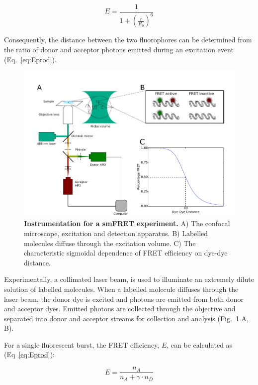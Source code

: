 \begin{equation}
E = \frac{1}{1 + (\frac{r}{R_0})^6} 
\label{eq:efficiency}
\end{equation}

Consequently, the distance between the two fluorophores can be determined from the ratio of donor and acceptor photons emitted during an excitation event (Eq.~\ref{eq:Eprod}).

\begin{figure}[!ht]
   \begin{center}
      \includegraphics*[clip=true, width=5in]{pyFRET/Fig1_schematic.pdf}
      \caption{{\bf Instrumentation for a smFRET experiment.} A) The confocal microscope, excitation and detection apparatus. B) Labelled molecules diffuse through the excitation volume. C) The characteristic sigmoidal dependence of FRET efficiency on dye-dye distance.}
      \label{fig:fig1_instrumentation}
   \end{center}
\end{figure}


Experimentally, a collimated laser beam, is used to illuminate an extremely dilute solution of labelled molecules. When a labelled molecule diffuses through the laser beam, the donor dye is excited and photons are emitted from both donor and acceptor dyes.  Emitted photons are collected through the objective and separated into donor and acceptor streams for collection and analysis (Fig.~\ref{fig:fig1_instrumentation} A, B). 

For a single fluorescent burst, the FRET efficiency, $E$, can be calculated as (Eq~\ref{eq:Eprod}):

\begin{equation}
E = \frac{n_A}{n_A + \gamma \cdot n_D}
\label{eq:Eprod}
\end{equation} 

